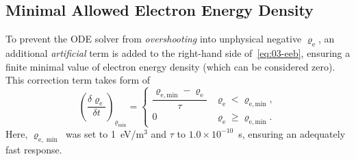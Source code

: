 \subsection{Minimal Allowed Electron Energy Density}\label{subsec:03-minimal-allowed-electron-energy-density}
To prevent the ODE solver from \emph{overshooting} into unphysical negative $\varrho_{\mathrm{e}}$, an additional
\emph{artificial} term is added to the right-hand side of~\eqref{eq:03-eeb}, ensuring a finite minimal value of electron
energy density (which can be considered zero).
This correction term takes form of
\begin{equation}
    \left( \frac{\delta \varrho_{\mathrm{e}}}{\delta t} \right)_{\varrho_{\mathrm{min}}} =
    \begin{cases}
        \dfrac{\varrho_{\mathrm{e, min}} - \varrho_{\mathrm{e}}}
              {\tau} &
        \varrho_{\mathrm{e}} < \varrho_{\mathrm{e, min}}, \\
        0 &
        \varrho_{\mathrm{e}} \ge \varrho_{\mathrm{e, min}}.
    \end{cases}
\end{equation}
Here, $\varrho_{\mathrm{e}, \min}$ was set to 1~eV/m$^{3}$ and $\tau$ to $1.0 \times 10^{-10}$~s,
ensuring an adequately fast response.
